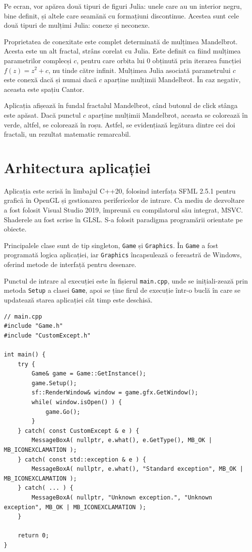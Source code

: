 \documentclass[12pt]{report}
\begin{document}
Pe ecran, vor apărea două tipuri de figuri Julia: unele care au un interior negru, bine definit, și altele care seamănă cu formațiuni discontinue.
Acestea sunt cele două tipuri de mulțimi Julia: conexe și neconexe. 

Proprietatea de conexitate este complet determinată de mulțimea Mandelbrot. Acesta este un alt fractal, strâns corelat cu Julia.
Este definit ca fiind mulțimea parametrilor complecși \(c\), pentru care orbita lui \(0\) obținută prin iterarea funcției
\(f(z) = z^2 + c\), nu tinde către infinit.
Mulțimea Julia asociată parametrului \(c\) este conexă dacă și numai dacă \(c\) aparține mulțimii Mandelbrot.
În caz negativ, aceasta este spațiu Cantor.

Aplicația afișează în fundal fractalul Mandelbrot, când butonul de click stânga este apăsat. Dacă punctul \(c\) aparține mulțimii Mandelbrot,
aceasta se colorează în verde, altfel, se colorează în roșu. Astfel, se evidențiază legătura dintre
cei doi fractali, un rezultat matematic remarcabil.

\chapter{Arhitectura aplicației}

Aplicația este scrisă în limbajul C++20, folosind interfața SFML 2.5.1 pentru grafică în OpenGL și gestionarea perifericelor de intrare.
Ca mediu de dezvoltare a fost folosit Visual Studio 2019, împreună cu compilatorul său integrat, MSVC.
Shaderele au fost scrise în GLSL. S-a folosit paradigma programării orientate pe obiecte.

Principalele clase sunt de tip singleton, \texttt{Game} și \texttt{Graphics}. În \texttt{Game} a fost programată logica aplicației, iar \texttt{Graphics} încapsulează
o fereastră de Windows, oferind metode de interfață pentru desenare.

Punctul de intrare al execuției este în fișierul \texttt{main.cpp}, unde se inițiali\hyp{}zează prin metoda \texttt{Setup} a clasei \texttt{Game}, apoi se ține firul de execuție într-o buclă în care se updatează starea aplicației cât timp este deschisă.
\begin{lstlisting}[caption=main.cpp]
// main.cpp
#include "Game.h"
#include "CustomExcept.h"

int main() {
	try {
		Game& game = Game::GetInstance();
		game.Setup();
		sf::RenderWindow& window = game.gfx.GetWindow();
		while( window.isOpen() ) {
			game.Go();
		}
	} catch( const CustomExcept & e ) {
		MessageBoxA( nullptr, e.what(), e.GetType(), MB_OK | MB_ICONEXCLAMATION );
	} catch( const std::exception & e ) {
		MessageBoxA( nullptr, e.what(), "Standard exception", MB_OK | MB_ICONEXCLAMATION );
	} catch( ... ) {
		MessageBoxA( nullptr, "Unknown exception.", "Unknown exception", MB_OK | MB_ICONEXCLAMATION );
	}

	return 0;
}
\end{lstlisting}
\end{document}
